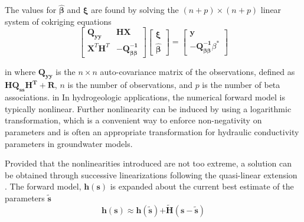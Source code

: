 \documentclass[11pt,oneside,onecolumn]{usgsreport}
\begin{document}
\begin{appendix}
\begin{bibunit}
The values for $\mathbf{\hat{\beta}}$ and $\mathbf{\xi}$ are found
by solving the $(n+p)\times(n+p)$ linear system of cokriging equations
\begin{equation}
\left[\begin{array}{cc}
\mathbf{Q_{yy}} & \mathbf{HX}\\
\mathbf{X}^{T}\mathbf{H}^{T} & \mathbf{-}\mathbf{Q_{\beta\beta}^{-1}}
\end{array}\right]\left[\begin{array}{c}
\mathbf{\xi}\\
\mathbf{\hat{\beta}}
\end{array}\right]=\left[\begin{array}{c}
\mathbf{y}\\
\mathbf{-}\mathbf{Q_{\beta\beta}^{-1}}\beta^{*}
\end{array}\right]\label{eq:cokriging-1}
\end{equation}

 in
where $\mathbf{Q_{yy}}$ is the $n\times n$ auto-covariance matrix
of the observations, defined as $\mathbf{HQ_{ss}H^{\mathbf{T}}+R}$,
$n$ is the number of observations, and $p$ is the number of beta
associations.
 in
In hydrogeologic applications, the numerical forward model is typically
nonlinear. Further nonlinearity can be induced by using a logarithmic
transformation, which is a convenient way to enforce non-negativity
on parameters and is often an appropriate transformation for hydraulic
conductivity parameters in groundwater models.

Provided that the nonlinearities introduced are not too extreme, a
solution can be obtained through successive linearizations following
the quasi-linear extension \citep{Kitanidis1995}. The forward model,
$\mathbf{h(s)}$ is expanded about the current best estimate of the
parameters $\mathbf{\tilde{s}}$
\[
\mathbf{h}(\mathbf{s})\mathbf{\approx h}(\mathbf{\tilde{s}})\mathbf{+\tilde{H}}(\mathbf{s-\tilde{s}})
\]


\end{bibunit}
\end{appendix}
\end{document}
